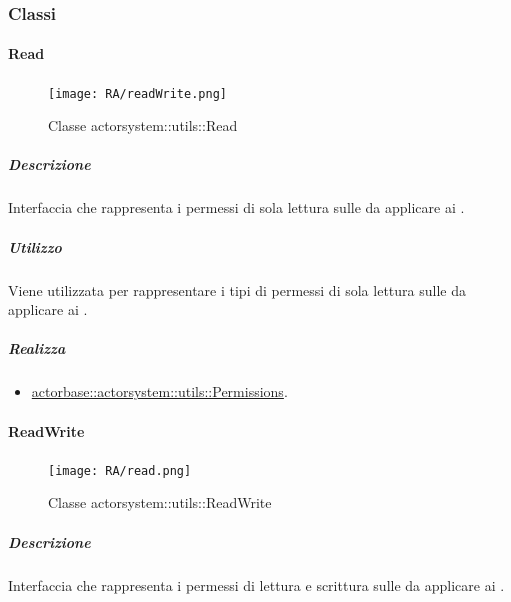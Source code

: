 \documentclass{scalatekids-article}
\begin{document}
\subsubsection{Classi}


\paragraph{Read}
\label{sec:actorbase::actorsystem::utils::Read}

\begin{figure}[H]
  \begin{center}
    \texttt{[image: RA/readWrite.png]}
    \caption{Classe actorsystem::utils::Read}
  \end{center}
\end{figure}

\subparagraph{Descrizione}

Interfaccia che rappresenta i permessi di sola lettura sulle 
da applicare ai .

\subparagraph{Utilizzo}

Viene utilizzata per rappresentare i tipi di permessi di sola lettura sulle
 da applicare ai .

\subparagraph{Realizza}

\begin{itemize}
\item \hyperref[sec:actorbase::actorsystem::utils::Read]{actorbase::actorsystem::utils::Permissions}.
\end{itemize}

\paragraph{ReadWrite}
\label{sec:actorbase::actorsystem::utils::ReadWrite}

\begin{figure}[H]
  \begin{center}
    \texttt{[image: RA/read.png]}
    \caption{Classe actorsystem::utils::ReadWrite}
  \end{center}
\end{figure}

\subparagraph{Descrizione}

Interfaccia che rappresenta i permessi di lettura e scrittura sulle
 da applicare ai .
\end{document}
